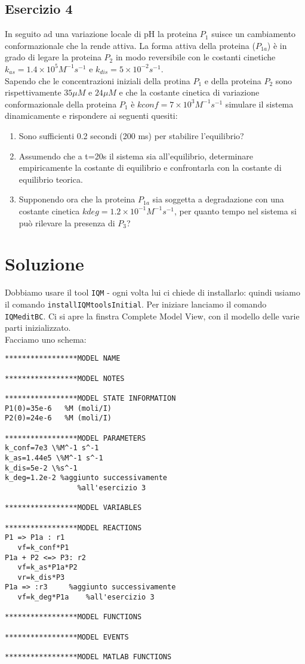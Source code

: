 \documentclass{article}
\begin{document}
\subsection*{Esercizio 4}
In seguito ad una variazione locale di pH la proteina $P_1$ suisce un cambiamento conformazionale che la rende attiva. La forma attiva della proteina ($P_{1a}$)
è in grado di legare la proteina $P_2$ in modo reversibile con le costanti cinetiche $k_{as} = 1.4 \times 10^5 M^{-1}s^{-1}$ e $k_{dis} = 5 \times 10^{-2}s^{-1}$.\\
Sapendo che le concentrazioni iniziali della protina $P_1$ e della proteina $P_2$ sono rispettivamente $35 \mu M$ e $24 \mu M$ e che la costante cinetica di variazione conformazionale della proteina $P_1$ è $kconf = 7 \times 10^3 M^{-1}s^{-1}$
simulare il sistema dinamicamente e rispondere ai seguenti quesiti:
\begin{enumerate}
   \item Sono sufficienti 0.2 secondi (200 ms) per stabilire l'equilibrio?
   \item Assumendo che a t=20s il sistema sia all'equilibrio, determinare empiricamente la costante di equilibrio e confrontarla con la costante di equilibrio teorica.
   \item Supponendo ora che la proteina $P_{1a}$ sia soggetta a degradazione con una costante cinetica $kdeg=1.2 \times 10^{-1} M^{-1}s^{-1}$, per quanto tempo nel sistema si può rilevare la presenza di $P_3$?
\end{enumerate}
\section*{Soluzione}
Dobbiamo usare il tool \texttt{IQM} - ogni volta lui ci chiede di installarlo: quindi usiamo il comando \texttt{installIQMtoolsInitial}. Per iniziare lanciamo il comando \texttt{IQMeditBC}. Ci si apre la finstra Complete Model View, con il modello delle varie parti inizializzato.\\
Facciamo uno schema: 
\begin{verbatim}
*****************MODEL NAME

*****************MODEL NOTES

*****************MODEL STATE INFORMATION
P1(0)=35e-6   %M (moli/I)
P2(0)=24e-6   %M (moli/I)

*****************MODEL PARAMETERS
k_conf=7e3 \%M^-1 s^-1
k_as=1.44e5 \%M^-1 s^-1
k_dis=5e-2 \%s^-1
k_deg=1.2e-2 %aggiunto successivamente
                 %all'esercizio 3

*****************MODEL VARIABLES

*****************MODEL REACTIONS
P1 => P1a : r1
   vf=k_conf*P1
P1a + P2 <=> P3: r2
   vf=k_as*P1a*P2
   vr=k_dis*P3
P1a => :r3     %aggiunto successivamente
   vf=k_deg*P1a    %all'esercizio 3

*****************MODEL FUNCTIONS

*****************MODEL EVENTS

*****************MODEL MATLAB FUNCTIONS
\end{verbatim}
\end{document}
